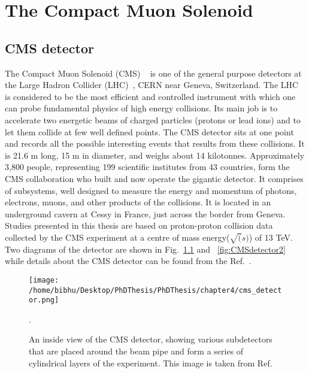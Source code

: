  
\chapter{The Compact Muon Solenoid \label{The Compact Muon Solenoid}}

\section{CMS detector}
The Compact Muon Solenoid (CMS) ~\cite{cms-jinst} is one of the general purpose detectors at the Large Hadron Collider (LHC)~\cite{theLHC}, CERN near Geneva, Switzerland. The LHC is considered to be the most efficient and controlled instrument with which one can probe fundamental physics of high energy collisions. Its main job is to accelerate two energetic beams of charged particles (protons or lead ions) and to let them collide at few well defined points. The CMS detector sits at one point and records all the possible interesting events that results from these collisions. It is 21.6 m long, 15 m in diameter, and weighs about 14 kilotonnes. Approximately 3,800 people, representing 199 scientific institutes from 43 countries, form the CMS collaboration who built and now operate the gigantic detector. It comprises of subsystems, well designed to measure the energy and momentum of photons, electrons, muons, and other products of the collisions. It is located in an underground cavern at Cessy in France, just across the border from Geneva. Studies presented in this thesis are based on proton-proton collision data collected by the CMS experiment at a centre of mass energy($\sqrt(s)$) of 13 TeV. Two diagrams of the detector are shown in Fig.~\ref{fig:CMSdetector1Thesis} and ~\ref{fig:CMSdetector2} while details about the CMS detector can be found from the Ref.~\cite{physics-tdr-8.1, physics-tdr-8.2}.
\begin{figure}[h]
    \centering
    \texttt{[image: /home/bibhu/Desktop/PhDThesis/PhDThesis/chapter4/cms\_detector.png]}
    \caption{ \small An inside view of the CMS detector, showing various subdetectors that are placed around the beam pipe and form a series of cylindrical layers of the experiment. This image is taken from Ref.~\cite{cms-det}}.
    \label{fig:CMSdetector1Thesis}
\end{figure}


